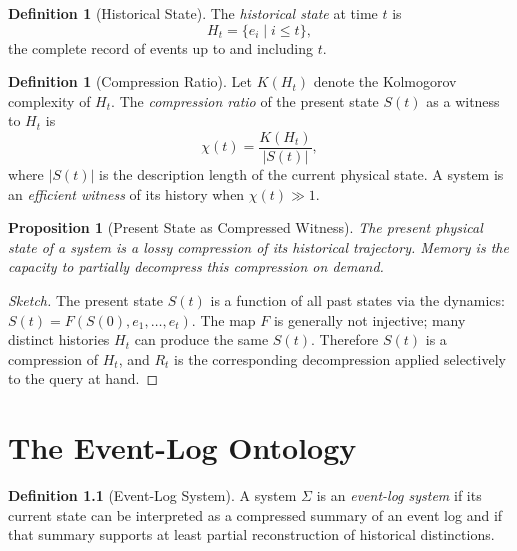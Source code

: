 \documentclass[12pt, oneside]{book}
\theoremstyle{plain}
\newtheorem{proposition}[theorem]{Proposition}
\theoremstyle{definition}
\newtheorem{definition}[theorem]{Definition}
\theoremstyle{remark}
\begin{document}
\begin{definition}[Historical State]
The \emph{historical state} at time $t$ is
\[
  H_t = \{e_i \mid i \leq t\},
\]
the complete record of events up to and including $t$.
\end{definition}

\begin{definition}[Compression Ratio]
Let $K(H_t)$ denote the Kolmogorov complexity of $H_t$.
The \emph{compression ratio} of the present state $S(t)$
as a witness to $H_t$ is
\[
  \chi(t) = \frac{K(H_t)}{|S(t)|},
\]
where $|S(t)|$ is the description length of the current
physical state.
A system is an \emph{efficient witness} of its history when
$\chi(t) \gg 1$.
\end{definition}

\begin{proposition}[Present State as Compressed Witness]
The present physical state of a system is a lossy compression
of its historical trajectory.
Memory is the capacity to partially decompress this compression
on demand.
\end{proposition}

\begin{proof}[Sketch]
The present state $S(t)$ is a function of all past states
via the dynamics: $S(t) = F(S(0), e_1, \ldots, e_t)$.
The map $F$ is generally not injective; many distinct
histories $H_t$ can produce the same $S(t)$.
Therefore $S(t)$ is a compression of $H_t$, and
$R_t$ is the corresponding decompression applied selectively
to the query at hand.
\end{proof}

\chapter{The Event-Log Ontology}

\begin{definition}[Event-Log System]
A system $\Sigma$ is an \emph{event-log system} if its
current state can be interpreted as a compressed summary
of an event log and if that summary supports
at least partial reconstruction of historical distinctions.
\end{definition}
\end{document}
